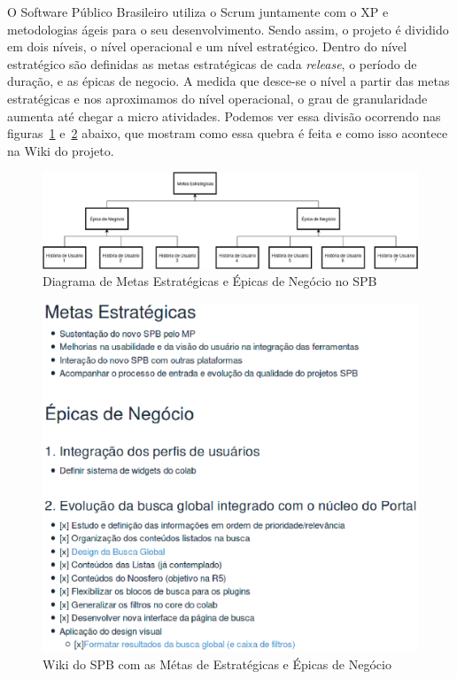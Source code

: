 O Software Público Brasileiro utiliza o Scrum juntamente com o XP e metodologias
ágeis para o seu desenvolvimento. Sendo assim, o projeto é dividido em dois níveis,
o nível operacional e um nível estratégico. Dentro do nível estratégico são definidas
as metas estratégicas de cada \textit{release}, o período de duração, e as épicas
de negocio. A medida que desce-se o nível a partir das metas estratégicas e nos
aproximamos do nível operacional, o grau de granularidade aumenta até chegar a
micro atividades. Podemos ver essa divisão ocorrendo nas figuras~\ref{fig:epics-diagram} 
e~\ref{fig:epics-wiki} abaixo, que mostram como essa quebra é feita e como isso acontece 
na Wiki do projeto.

\newpage
\begin{figure}[h]
    \centering
        \includegraphics[keepaspectratio=true,scale=0.3]{figuras/epics-diagram.eps}
    \caption{Diagrama de Metas Estratégicas e Épicas de Negócio no SPB}
    \label{fig:epics-diagram}
\end{figure}

\begin{figure}[h]
    \centering
        \includegraphics[keepaspectratio=true,scale=0.5]{figuras/wiki.eps}
    \caption{Wiki do SPB com as Métas de Estratégicas e Épicas de Negócio}
    \label{fig:epics-wiki}
\end{figure}

